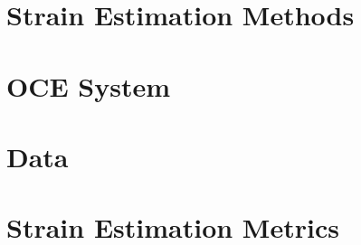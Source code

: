 \section{Strain Estimation Methods}

\section{OCE System}

\section{Data}

\section{Strain Estimation Metrics}
